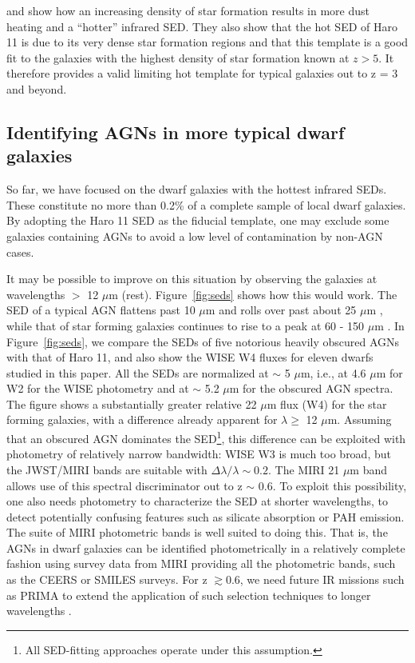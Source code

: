 \documentclass[twocolumn]{aastex63}
\begin{document}
{ \citet[][Figure 1]{Derossi2018} and \citet{Remy2015} show how an increasing density of star formation results in  more dust heating and a ``hotter'' infrared SED. They also show that the hot SED of Haro 11  is due to its very dense star formation regions and that
 this template is a good fit to the galaxies with the highest density of star
 formation known at $z > 5$. It therefore provides a valid limiting hot template
 for typical galaxies out to z = 3 and beyond.  


 \subsection{Identifying AGNs in more typical dwarf galaxies}

So far, we have focused on the dwarf galaxies with the hottest infrared SEDs.
These constitute no more than 0.2\% of a complete sample of local dwarf
galaxies. By adopting the Haro 11 SED as the fiducial template, one may
 exclude some galaxies containing AGNs to avoid a low level of
contamination by non-AGN cases. 

It may be possible to improve on this situation by observing the galaxies at
wavelengths $>$ 12 $\mu$m (rest). Figure~\ref{fig:seds} shows how this would
work. The SED of a typical AGN flattens past 10 $\mu$m and rolls over past about
25 $\mu$m \citep[e.g.,][]{Lyu2017}, while that of star forming galaxies
continues to rise to a peak at 60 - 150 $\mu$m \citep[e.g.,][]{Remy2015}. In Figure~\ref{fig:seds}, we compare the SEDs of five notorious heavily obscured AGNs with
that of Haro 11, and also show the WISE W4 fluxes for eleven dwarfs studied in
this paper. All the SEDs are normalized at $\sim$ 5 $\mu$m, i.e., at 4.6 $\mu$m
for W2 for the WISE photometry and at $\sim$ 5.2 $\mu$m for the obscured AGN
spectra. The figure shows a substantially greater relative 22 $\mu$m flux (W4)
for the star forming galaxies, with a difference already apparent for $\lambda
\ge$ 12 $\mu$m. Assuming that an obscured AGN dominates the SED\footnote{All
SED-fitting approaches operate under this assumption.}, this difference can be
exploited with photometry of relatively narrow bandwidth: WISE W3 is much too
broad, but the JWST/MIRI bands are suitable with $\Delta \lambda/\lambda \sim
0.2$. The MIRI 21 $\mu$m band allows use of this spectral discriminator out to z
$\sim$ 0.6. To exploit
this possibility, one also needs photometry to characterize the SED at shorter
wavelengths, to detect potentially confusing features such as silicate
absorption or PAH emission. The suite of MIRI photometric bands is well suited
to doing this. That is, the AGNs in dwarf galaxies can be identified
photometrically in a relatively complete fashion using survey data from MIRI
providing all the photometric bands, such as the CEERS \citep{Finkelstein2025}
or SMILES \citep{Rieke2024} surveys. For z $\gtrsim0.6$, we need future IR
missions such as PRIMA \citep{PRIMA2025} to extend the application of such selection techniques to
longer wavelengths \citep{Barchiesi2025}. 

}
\end{document}
